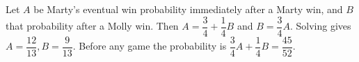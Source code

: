 Let $A$ be Marty's eventual win probability immediately after a Marty win, and $B$ that probability after a Molly win. Then $A=\dfrac{3}{4}+\dfrac{1}{4}B$ and $B=\dfrac{3}{4}A$. Solving gives $A=\dfrac{12}{13},B=\dfrac{9}{13}$. Before any game the probability is $\dfrac{3}{4}A+\dfrac{1}{4}B=\boxed{\dfrac{45}{52}}$.
